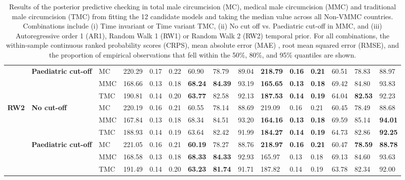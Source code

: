 \documentclass{article}
\begin{document}
\begin{landscape}
{\begin{table}[H]
\begin{tabular}{>{\bfseries}p{0.75cm} 
     >{\bfseries}p{3cm} p{1cm} C{1.25cm} 
     C{1.25cm} C{1.25cm} C{1.25cm} C{1.25cm} C{1.25cm} C{1.25cm} C{1.25cm} 
     C{1.25cm} C{1.25cm} C{1.25cm} C{1.25cm}}
  & Paediatric cut-off & MC & 220.29 &   0.17 &   0.22 &  60.90 &  78.79 &  89.04 & \bf218.79 & \bf  0.16 & \bf  0.21 &  60.51 &  78.83 &  88.97 \\ 
  &  & MMC & 168.66 &   0.13 &   0.18 & \bf 68.24 & \bf 84.39 &  93.19 & \bf165.65 & \bf  0.13 & \bf  0.18 &  69.42 &  84.80 &  93.83 \\ 
  &  & TMC & 190.81 &   0.14 &   0.20 & \bf 63.77 &  82.58 &  92.13 & \bf187.53 & \bf  0.14 & \bf  0.19 &  64.04 & \bf 82.53 &  92.23 \\ 
 RW2 & No cut-off & MC & 220.19 &   0.16 &   0.21 &  60.55 &  78.14 &  88.69 & 219.09 &   0.16 &   0.21 &  60.45 &  78.49 &  88.68 \\ 
  &  & MMC & 167.84 &   0.13 &   0.18 &  68.34 &  84.51 &  93.20 & \bf164.16 & \bf  0.13 & \bf  0.18 &  69.59 &  85.14 & \bf 94.01 \\ 
  &  & TMC & 188.93 &   0.14 &   0.19 &  63.64 &  82.42 &  91.99 & \bf184.27 & \bf  0.14 & \bf  0.19 &  64.73 &  82.86 & \bf 92.25 \\ 
  & Paediatric cut-off & MC & 221.05 &   0.16 &   0.21 & \bf 60.19 &  78.27 &  88.76 & \bf218.97 & \bf  0.16 & \bf  0.21 &  60.47 & \bf 78.59 & \bf 88.78 \\ 
  &  & MMC & 168.58 &   0.13 &   0.18 & \bf 68.33 & \bf 84.33 &  92.93 & 165.97 &   0.13 &   0.18 &  69.13 &  84.60 &  93.63 \\ 
  &  & TMC & 191.49 &   0.14 &   0.20 & \bf 63.23 & \bf 81.74 &  91.71 & 187.82 &   0.14 &   0.19 &  63.78 &  82.34 &  92.00 \\ 
  \hline 
  \end{tabular} 
  \caption{Results of the posterior predictive checking in total 
             male circumcision (MC), medical male circumcision (MMC) and 
             traditional male circumcision (TMC) from fitting the 12 candidate 
             models and taking the median value across all Non-VMMC countries. Combinations include 
             (i) Time invariant or Time variant TMC, 
             (ii) No cut off vs. Paediatric cut-off in MMC, and 
             (iii) Autoregressive order 1 (AR1), Random Walk 1 (RW1) or 
             Random Walk 2 (RW2) temporal prior. 
             For all combinations, the within-sample continuous ranked 
             probability scores (CRPS), mean absolute error (MAE) , 
             root mean squared error (RMSE), and the proportion of empirical 
             observations that fell within the 50\%, 80\%, and 95\% 
             quantiles are shown.} 
  \label{tab::PPC1Non-VMMC} 
\end{table}} 

\end{landscape}
\end{document}
